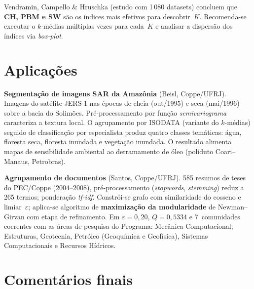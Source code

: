 Vendramin, Campello \& Hruschka (estudo com 1\,080 datasets) concluem
que \textbf{CH, PBM e SW} são os índices mais efetivos para
descobrir~$K$. Recomenda-se executar o $k$-médias múltiplas vezes para
cada~$K$ e analisar a dispersão dos índices via \emph{box-plot}.

\section{Aplicações}

\begin{aplicacao}
\textbf{Segmentação de imagens SAR da Amazônia} (Beisl, Coppe/UFRJ).
Imagens do satélite JERS-1 nas épocas de cheia (out/1995) e seca
(mai/1996) sobre a bacia do Solimões. Pré-processamento por função
\emph{semivariograma} caracteriza a textura local. O agrupamento por
ISODATA (variante do $k$-médias) seguido de classificação por
especialista produz quatro classes temáticas: água, floresta seca,
floresta inundada e vegetação inundada. O resultado alimenta mapas de
sensibilidade ambiental ao derramamento de óleo (poliduto
Coari--Manaus, Petrobras).
\end{aplicacao}

\begin{aplicacao}
\textbf{Agrupamento de documentos} (Santos, Coppe/UFRJ). 585 resumos
de teses do PEC/Coppe (2004--2008), pré-processamento (\emph{stopwords},
\emph{stemming}) reduz a 265 termos; ponderação \emph{tf-idf}.
Constrói-se grafo com similaridade do cosseno e limiar~$\varepsilon$;
aplica-se algoritmo de \textbf{maximização da modularidade} de
Newman--Girvan com etapa de refinamento. Em $\varepsilon=0{,}20$,
$Q=0{,}5334$ e 7~comunidades coerentes com as áreas de pesquisa do
Programa: Mecânica Computacional, Estruturas, Geotecnia, Petróleo
(Geoquímica e Geofísica), Sistemas Computacionais e Recursos Hídricos.
\end{aplicacao}

\section{Comentários finais}

